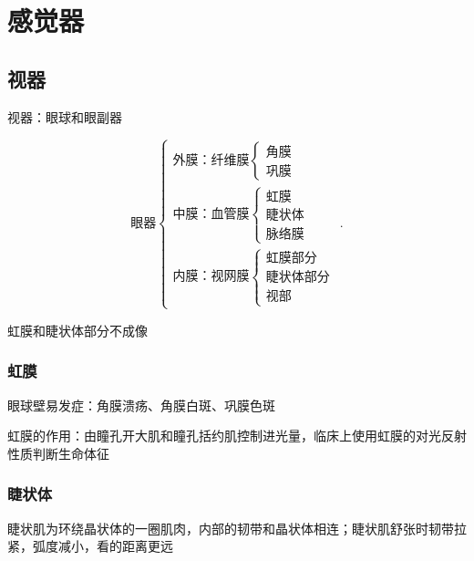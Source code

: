 \section{感觉器}%
\label{sec:感觉器}
\subsection{视器}%
\label{sub:视器}
\begin{notation}
    视器：眼球和眼副器
\end{notation}
\[
    \text{眼器}
    \begin{cases}
        \text{外膜：纤维膜}\begin{cases}
            \text{角膜}\\
            \text{巩膜}
        \end{cases}\\
        \text{中膜：血管膜}\begin{cases}
            \text{虹膜}\\
            \text{睫状体}\\
            \text{脉络膜}
        \end{cases}\\
        \text{内膜：视网膜}\begin{cases}
            \text{虹膜部分}\\
            \text{睫状体部分}\\
            \text{视部}
        \end{cases}
    \end{cases}
.\]
\begin{notation}
    虹膜和睫状体部分不成像
\end{notation}
\subsubsection*{虹膜}%
\label{subsub:虹膜}
\begin{notation}
眼球壁易发症：角膜溃疡、角膜白斑、巩膜色斑
\end{notation}
\begin{notation}
    虹膜的作用：由瞳孔开大肌和瞳孔括约肌控制进光量，临床上使用虹膜的对光反射性质判断生命体征
\end{notation}
\subsubsection*{睫状体}%
\label{subsub:睫状体}
睫状肌为环绕晶状体的一圈肌肉，内部的韧带和晶状体相连；睫状肌舒张时韧带拉紧，弧度减小，看的距离更远
